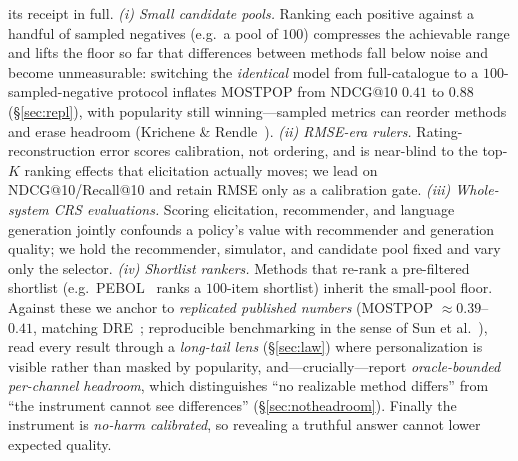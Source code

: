 \documentclass[11pt]{article}
\begin{document}
its receipt in full. \emph{(i) Small candidate
pools.} Ranking each positive against a handful of sampled negatives (e.g.\ a pool of $100$) compresses the achievable
range and lifts the floor so far that differences between methods fall below noise and become unmeasurable: switching the
\emph{identical} model from full-catalogue to a $100$-sampled-negative protocol inflates MOSTPOP from NDCG@10 $0.41$ to
$0.88$ (\S\ref{sec:repl}), with popularity still winning---sampled metrics can reorder methods and erase headroom
(Krichene \& Rendle~\cite{kr20}). \emph{(ii) RMSE-era rulers.} Rating-reconstruction error scores calibration, not
ordering, and is near-blind to the top-$K$ ranking effects that elicitation actually moves; we lead on NDCG@10/Recall@10
and retain RMSE only as a calibration gate. \emph{(iii) Whole-system CRS evaluations.} Scoring elicitation, recommender,
and language generation jointly confounds a policy's value with recommender and generation quality; we hold the
recommender, simulator, and candidate pool fixed and vary only the selector. \emph{(iv) Shortlist rankers.} Methods that
re-rank a pre-filtered shortlist (e.g.\ PEBOL~\cite{pebol24} ranks a $100$-item shortlist) inherit the small-pool floor.
Against these we anchor to \emph{replicated published numbers} (MOSTPOP $\approx0.39$--$0.41$, matching DRE~\cite{dre20};
reproducible benchmarking in the sense of Sun et al.~\cite{sun20}), read every result through a \emph{long-tail lens}
(\S\ref{sec:law}) where personalization is visible rather than masked by popularity, and---crucially---report
\emph{oracle-bounded per-channel headroom}, which distinguishes ``no realizable method differs'' from ``the instrument
cannot see differences'' (\S\ref{sec:notheadroom}). Finally the instrument is \emph{no-harm calibrated}, so revealing a
truthful answer cannot lower expected quality.
\end{document}
